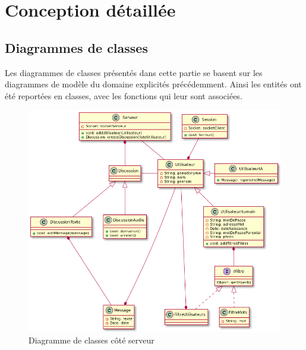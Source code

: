 \documentclass[a4paper,12pt]{article}
\begin{document}
	\newpage

	\section{Conception détaillée}

	\subsection{Diagrammes de classes}
	Les diagrammes de classes présentés dans cette partie se basent sur les diagrammes de modèle du domaine explicités précédemment.
	Ainsi les entités ont été reportées en classes, avec les fonctions qui leur sont associées.
	\begin{figure}[H]
		\centerline{\includegraphics[width=16.5cm]{../diagrammes/img/classesServeur.png}}
		\caption{Diagramme de classes côté serveur}
	\end{figure}

	\newpage
\end{document}
